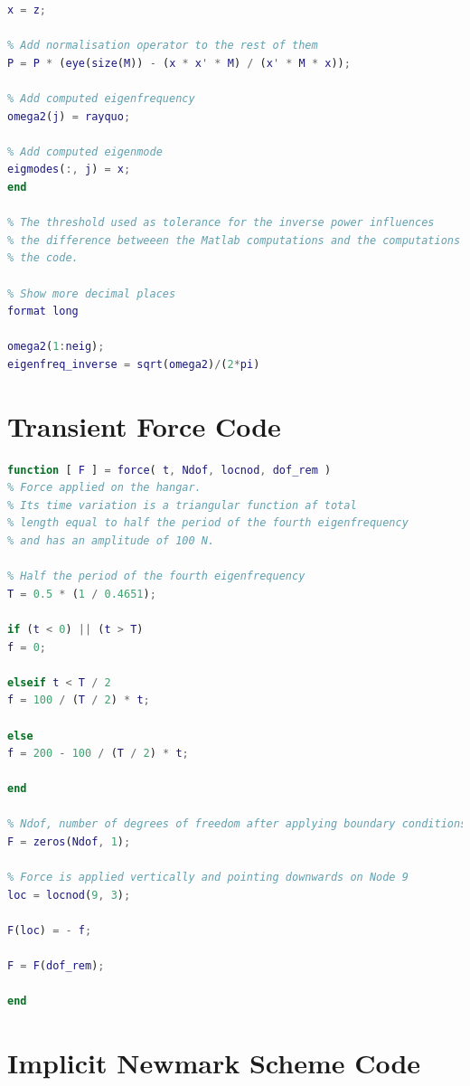 \documentclass[AMdocument,optEnglish]{AMlatex}  %
\begin{document}
\begin{lstlisting}[language=Matlab]
% Eigenmode
x = z;

% Add normalisation operator to the rest of them
P = P * (eye(size(M)) - (x * x' * M) / (x' * M * x));

% Add computed eigenfrequency
omega2(j) = rayquo;

% Add computed eigenmode
eigmodes(:, j) = x;
end

% The threshold used as tolerance for the inverse power influences
% the difference betweeen the Matlab computations and the computations from
% the code.

% Show more decimal places
format long

omega2(1:neig);
eigenfreq_inverse = sqrt(omega2)/(2*pi)
\end{lstlisting}

\section{Transient Force Code}
\label{sec:force}

\begin{lstlisting}[language=Matlab]
function [ F ] = force( t, Ndof, locnod, dof_rem )
% Force applied on the hangar.
% Its time variation is a triangular function af total 
% length equal to half the period of the fourth eigenfrequency
% and has an amplitude of 100 N.

% Half the period of the fourth eigenfrequency
T = 0.5 * (1 / 0.4651);

if (t < 0) || (t > T)
f = 0;

elseif t < T / 2
f = 100 / (T / 2) * t;

else
f = 200 - 100 / (T / 2) * t;

end

% Ndof, number of degrees of freedom after applying boundary conditions
F = zeros(Ndof, 1);

% Force is applied vertically and pointing downwards on Node 9
loc = locnod(9, 3);

F(loc) = - f;

F = F(dof_rem);

end
\end{lstlisting}

\section{Implicit Newmark Scheme Code}
\label{sec:implicit-code}
\end{document}
